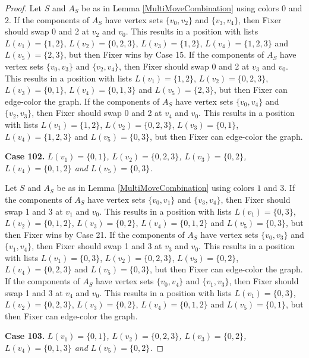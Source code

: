 \documentclass[12pt]{amsart}
\theoremstyle{plain}
\theoremstyle{definition}
\theoremstyle{remark}
\begin{document}
\begin{proof}
Let $S$ and $A_S$ be as in Lemma \ref{MultiMoveCombination} using colors $0$ and $2$. If the components of $A_S$ have vertex sets $\{v_0, v_2\}$ and $\{v_3, v_4\}$, then Fixer should swap 0 and 2 at $v_2$ and $v_0$. This results in a position with lists $L(v_1) = \{1, 2\}$, $L(v_2) = \{0, 2, 3\}$, $L(v_3) = \{1, 2\}$, $L(v_4) = \{1, 2, 3\}$ and $L(v_5) = \{2, 3\}$, but then Fixer wins by Case 15.
If the components of $A_S$ have vertex sets $\{v_0, v_3\}$ and $\{v_2, v_4\}$, then Fixer should swap 0 and 2 at $v_3$ and $v_0$. This results in a position with lists $L(v_1) = \{1, 2\}$, $L(v_2) = \{0, 2, 3\}$, $L(v_3) = \{0, 1\}$, $L(v_4) = \{0, 1, 3\}$ and $L(v_5) = \{2, 3\}$, but then Fixer can edge-color the graph.
If the components of $A_S$ have vertex sets $\{v_0, v_4\}$ and $\{v_2, v_3\}$, then Fixer should swap 0 and 2 at $v_4$ and $v_0$. This results in a position with lists $L(v_1) = \{1, 2\}$, $L(v_2) = \{0, 2, 3\}$, $L(v_3) = \{0, 1\}$, $L(v_4) = \{1, 2, 3\}$ and $L(v_5) = \{0, 3\}$, but then Fixer can edge-color the graph.

\noindent\textbf{Case 102.  }\textit{$L(v_1) = \{0, 1\}$, $L(v_2) = \{0, 2, 3\}$, $L(v_3) = \{0, 2\}$, $L(v_4) = \{0, 1, 2\}$ and $L(v_5) = \{0, 3\}$.}

Let $S$ and $A_S$ be as in Lemma \ref{MultiMoveCombination} using colors $1$ and $3$. If the components of $A_S$ have vertex sets $\{v_0, v_1\}$ and $\{v_3, v_4\}$, then Fixer should swap 1 and 3 at $v_1$ and $v_0$. This results in a position with lists $L(v_1) = \{0, 3\}$, $L(v_2) = \{0, 1, 2\}$, $L(v_3) = \{0, 2\}$, $L(v_4) = \{0, 1, 2\}$ and $L(v_5) = \{0, 3\}$, but then Fixer wins by Case 21.
If the components of $A_S$ have vertex sets $\{v_0, v_3\}$ and $\{v_1, v_4\}$, then Fixer should swap 1 and 3 at $v_3$ and $v_0$. This results in a position with lists $L(v_1) = \{0, 3\}$, $L(v_2) = \{0, 2, 3\}$, $L(v_3) = \{0, 2\}$, $L(v_4) = \{0, 2, 3\}$ and $L(v_5) = \{0, 3\}$, but then Fixer can edge-color the graph.
If the components of $A_S$ have vertex sets $\{v_0, v_4\}$ and $\{v_1, v_3\}$, then Fixer should swap 1 and 3 at $v_4$ and $v_0$. This results in a position with lists $L(v_1) = \{0, 3\}$, $L(v_2) = \{0, 2, 3\}$, $L(v_3) = \{0, 2\}$, $L(v_4) = \{0, 1, 2\}$ and $L(v_5) = \{0, 1\}$, but then Fixer can edge-color the graph.

\noindent\textbf{Case 103.  }\textit{$L(v_1) = \{0, 1\}$, $L(v_2) = \{0, 2, 3\}$, $L(v_3) = \{0, 2\}$, $L(v_4) = \{0, 1, 3\}$ and $L(v_5) = \{0, 2\}$.}


\end{proof}
\end{document}
